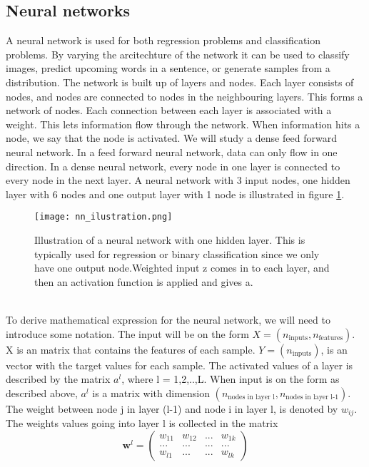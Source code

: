 \subsection{Neural networks}
A neural network is used for both regression problems and classification problems. By varying the arcitechture of the network it can be used to classify images, predict upcoming words in a sentence, or generate samples from a distribution. The network is built up of layers and nodes. Each layer consists of nodes, and nodes are connected to nodes in the neighbouring layers. This forms a network of nodes. Each connection between each layer is associated with a weight. This lets information flow through the network. When information hits a node, we say that the node is activated. We will study a dense feed forward neural network. In a feed forward neural network, data can only flow in one direction. In a dense neural network, every node in one layer is connected to every node in the next layer. A neural network with 3 input nodes, one hidden layer with 6 nodes and one output layer with 1 node is illustrated in figure \ref{fig:nn_illustration}.
\\
\begin{figure}[h!]
    \centering
    \texttt{[image: nn\_ilustration.png]}
    \caption{Illustration of a neural network with one hidden layer. This is typically used for regression or binary classification since we only have one output node.Weighted input z comes in to each layer, and then an activation function is applied and gives a.}
    \label{fig:nn_illustration}
\end{figure}
\\
To derive mathematical expression for the neural network, we will need to introduce some notation. The input will be on the form $X = (n_\text{inputs}, n_\text{features})$. X is an matrix that contains the features of each sample. $Y = (n_\text{inputs})$, is an vector with the target values for each sample. The activated values of a layer is described by the matrix $a^l$, where l = 1,2,..,L. When input is on the form as described above, $a^l$ is a matrix with dimension $(n_\text{nodes in layer l}, n_\text{nodes in layer l-1})$. The weight between node j in layer (l-1) and node i in layer l, is denoted by $w_{ij}$. The weights values going into layer l is collected in the matrix 
\begin{equation}
    \boldsymbol{w}^l = 
    \begin{pmatrix}
    w_{11} & w_{12} & ... & w_{1k} \\
    ... & ... & ... & ... \\
    w_{l1} & ... & ... & w_{lk}
    \end{pmatrix}
\end{equation}
